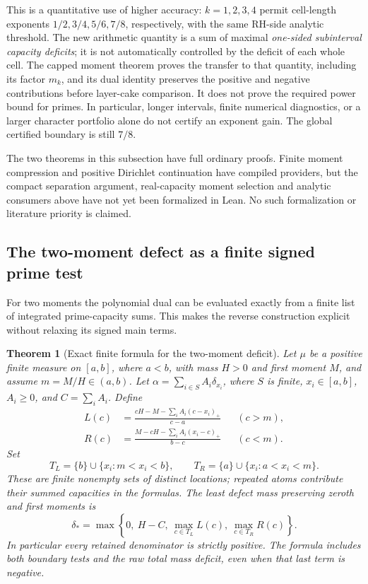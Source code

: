 \documentclass[11pt]{article}
\newtheorem{theorem}{Theorem}[section]
\theoremstyle{definition}
\begin{document}
This is a quantitative use of higher accuracy: $k=1,2,3,4$
permit cell-length exponents $1/2,3/4,5/6,7/8$, respectively,
with the same RH-side analytic threshold.
The new arithmetic quantity is a sum of maximal
\emph{one-sided subinterval capacity deficits}; it is not
automatically controlled by the deficit of each whole cell.
The capped moment theorem proves the transfer to that quantity,
including its factor $m_k$, and its dual identity preserves the
positive and negative contributions before layer-cake comparison.
It does not prove the required power bound for primes.
In particular, longer intervals, finite numerical diagnostics,
or a larger character portfolio alone do not certify an exponent
gain. The global certified boundary is still $7/8$.

The two theorems in this subsection have full ordinary proofs.
Finite moment compression and positive Dirichlet continuation
have compiled providers, but the compact separation argument,
real-capacity moment selection and analytic consumers above
have not yet been formalized in Lean. No such formalization
or literature priority is claimed.


\subsection{The two-moment defect as a finite signed prime test}
\label{sec:two-moment-capacity-test}

For two moments the polynomial dual can be evaluated exactly
from a finite list of integrated prime-capacity sums.
This makes the reverse construction explicit without relaxing
its signed main terms.

\begin{theorem}[Exact finite formula for the two-moment deficit]
\label{thm:two-moment-finite-capacity}
Let $\mu$ be a positive finite measure on $[a,b]$, where $a<b$,
with mass $H>0$ and first moment $M$, and assume
$m=M/H\in(a,b)$. Let
$\alpha=\sum_{i\in S}A_i\delta_{x_i}$, where $S$ is finite,
$x_i\in[a,b]$, $A_i\ge0$, and $C=\sum_i A_i$.
Define
\begin{align*}
 L(c)&=\frac{cH-M-\sum_i A_i(c-x_i)_+}{c-a}
                                      &&(c>m),\\
 R(c)&=\frac{M-cH-\sum_i A_i(x_i-c)_+}{b-c}
                                      &&(c<m).
\end{align*}
Set
\[
 T_L=\{b\}\cup\{x_i:m<x_i<b\},\qquad
 T_R=\{a\}\cup\{x_i:a<x_i<m\}.
\]
These are finite nonempty sets of distinct locations; repeated
atoms contribute their summed capacities in the formulas.
The least defect mass preserving zeroth and first moments is
\begin{equation}
 \delta_*=\max\left\{0,\ H-C,\
                    \max_{c\in T_L}L(c),\
                    \max_{c\in T_R}R(c)\right\}.
 \label{eq:two-moment-finite-defect}
\end{equation}
In particular every retained denominator is strictly positive.
The formula includes both boundary tests and the raw total
mass deficit, even when that last term is negative.
\end{theorem}
\end{document}
